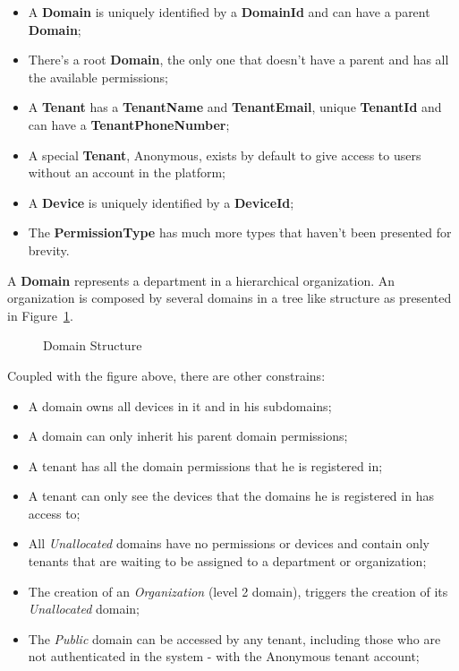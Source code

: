 \begin{itemize}
   \item A \textbf{Domain} is uniquely identified by a \textbf{DomainId} and can have a parent \textbf{Domain};
   \item There's a root \textbf{Domain}, the only one that doesn't have a parent and has all the available permissions;
   \item A \textbf{Tenant} has a \textbf{TenantName} and \textbf{TenantEmail}, unique \textbf{TenantId} and can have a \textbf{TenantPhoneNumber};
   \item A special \textbf{Tenant}, Anonymous, exists by default to give access to users without an account in the platform;
   \item A \textbf{Device} is uniquely identified by a \textbf{DeviceId};
   \item The \textbf{PermissionType} has much more types that haven't been presented for brevity.
\end{itemize}

A \textbf{Domain} represents a department in a hierarchical organization. An organization is composed by several domains in a tree like structure as presented in Figure~\ref{fig:design:domain:bounded_contexts:identity:organization}.

\begin{figure}[H]
   \centering
  \resizebox{\columnwidth}{!}
  {
     
  }
  \caption[Domain Structure]{Domain Structure}
  \label{fig:design:domain:bounded_contexts:identity:organization}
\end{figure}

Coupled with the figure above, there are other constrains:

\begin{itemize}
   \item A domain owns all devices in it and in his subdomains;
   \item A domain can only inherit his parent domain permissions;
   \item A tenant has all the domain permissions that he is registered in;
   \item A tenant can only see the devices that the domains he is registered in has access to;
   \item All \textit{Unallocated} domains have no permissions or devices and contain only tenants that are waiting to be assigned to a department or organization;
   \item The creation of an \textit{Organization} (level 2 domain), triggers the creation of its \textit{Unallocated} domain;
   \item The \textit{Public} domain can be accessed by any tenant, including those who are not authenticated in the system - with the Anonymous tenant account;
\end{itemize}

